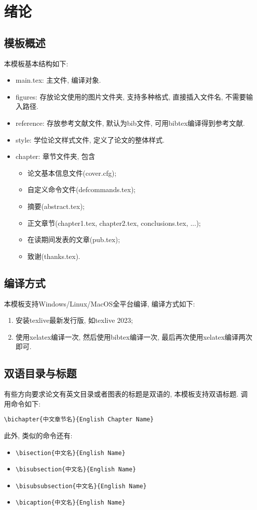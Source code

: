 \chapter{绪论} 
\label{chapter:Introduction}

\section{模板概述}
本模板基本结构如下:

\begin{itemize}
\item main.tex: 主文件, 编译对象.
\item figures: 存放论文使用的图片文件夹, 支持多种格式, 直接插入文件名, 不需要输入路径.
\item reference: 存放参考文献文件, 默认为bib文件, 可用bibtex编译得到参考文献.
\item style: 学位论文样式文件, 定义了论文的整体样式.
\item chapter: 章节文件夹, 包含
\begin{itemize}
\item 论文基本信息文件(cover.cfg);
\item 自定义命令文件(defcommands.tex);
\item 摘要(abstract.tex);
\item 正文章节(chapter1.tex, chapter2.tex, conclusions.tex, ...);
\item 在读期间发表的文章(pub.tex);
\item 致谢(thanks.tex).
\end{itemize}
\end{itemize}

\section{编译方式}
本模板支持Windows/Linux/MacOS全平台编译, 编译方式如下:
\begin{enumerate}
\item 安装texlive最新发行版, 如texlive 2023;
\item 使用xelatex编译一次, 然后使用bibtex编译一次, 最后再次使用xelatex编译两次即可.
\end{enumerate}

\section{双语目录与标题}
有些方向要求论文有英文目录或者图表的标题是双语的, 本模板支持双语标题. 调用命令如下:
\begin{verbatim}
\bichapter{中文章节名}{English Chapter Name}
\end{verbatim}
此外, 类似的命令还有: 
\begin{itemize}
\item \verb|\bisection{中文名}{English Name}|
\item \verb|\bisubsection{中文名}{English Name}|
\item \verb|\bisubsubsection{中文名}{English Name}|
\item \verb|\bicaption{中文名}{English Name}|
\end{itemize}


